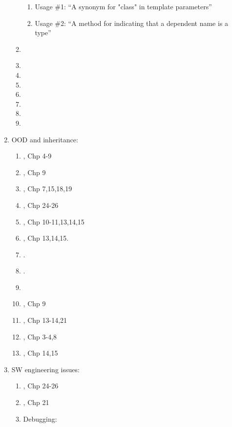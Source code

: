 \begin{enumerate}
\begin{enumerate}
\begin{enumerate}
		\item Usage \#1: ``A synonym for "class" in template parameters''
		\item Usage \#2: ``A method for indicating that a dependent name is a type''
		\end{enumerate}
	\item \cite[pp. 916]{Savitch2009}
	\item 
	\item 
	\item 
	\item 
	\item 
	\item 
	\item 
	\end{enumerate}
\item OOD and inheritance: \vspace{-0.3cm}
	\begin{enumerate} \itemsep -2pt
	\item \cite{Gregoire2014}, Chp 4-9
	\item \cite{Stroustrup2014}, Chp 9
	\item \cite{Lippman2013}, Chp 7,15,18,19
	\item \cite{Allain2012}, Chp 24-26
	\item \cite{Prata2012}, Chp 10-11,13,14,15
	\item \cite{Gaddis2010}, Chp 13,14,15.
	\item \cite[Chp. 13--15; Appendices E and J]{Gaddis2012}.
	\item \cite[Chp. 7, 11, 15; Appendices A, D, J, and K]{Gaddis2011}.
	\item \cite[Chp. 10; \S12.1, 696--711; Chp. 15; Chp. 17]{Savitch2009}
	\item \cite{Stroustrup2009}, Chp 9
	\item \cite{Oualline2003}, Chp 13-14,21
	\item \cite{Vermeir2001}, Chp 3-4,8
	\item \cite{Eckel2000}, Chp 14,15
	\end{enumerate}
\item SW engineering issues: \vspace{-0.3cm}
	\begin{enumerate} \itemsep -2pt
	\item \cite{Gregoire2014}, Chp 24-26
	\item \cite{Allain2012}, Chp 21
	\item Debugging: \vspace{-0.2cm}

\end{enumerate}
\end{enumerate}
